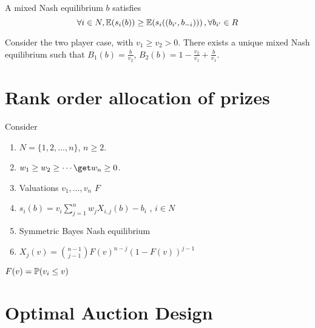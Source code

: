 A mixed Nash equilibrium $b$ satisfies
\begin{equation}
  \label{eq:3}
  \forall i \in N, \E{s_{i}(b)} \geq \E{s_{i}((b_{i'}, b_{-i}))}, \forall b_{i'} \in R
\end{equation}

Consider the two player case, with $v_{1} \geq v_{2} > 0$.  There
exists a unique mixed Nash equilibrium such that $B_{1}(b) =
\frac{b}{v_{2}}$, $B_{2}(b) = 1 - \frac{v_{2}}{v_{1}} +
\frac{b}{v_{1}}$.



\section{Rank order allocation of prizes}
\label{sec:rank-order-alloc}

Consider
\begin{enumerate}
\item $N = \{ 1,2, \dots, n \}$, $n \geq 2$.
\item $w_{1} \geq w_{2} \geq \cdots \get w_{n} \geq 0$.
\item Valuations $v_{1}, \dots, v_{n}$ \iid $F$
\item $s_{i}(b) = v_{i} \sum_{j=1}^{n} w_{j} X_{i, j}(b) - b_{i}$  , $
  i \in N$
\item Symmetric Bayes Nash equilibrium
\item $X_{j}(v) = {n-1 \choose j - 1} F(v)^{n-j} (1-F(v))^{j-1}$
\end{enumerate}

$F(v) = \Prob{v_{i} \leq v}$

\section{Optimal Auction Design}
\label{sec:optim-auct-design}


